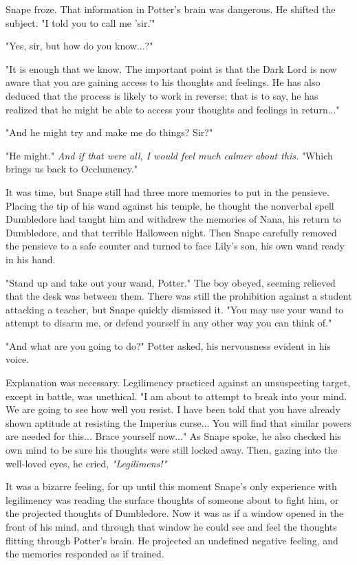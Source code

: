\documentclass[a4paper,11pt]{article}
\begin{document}
Snape froze. That information in Potter's brain was dangerous. He shifted the subject. "I told you to call me 'sir.'"

"Yes, sir, but how do you know...?"

"It is enough that we know. The important point is that the Dark Lord is now aware that you are gaining access to his thoughts and feelings. He has also deduced that the process is likely to work in reverse; that is to say, he has realized that he might be able to access your thoughts and feelings in return..."

"And he might try and make me do things? Sir?"

"He might." \emph{And if that were all, I would feel much calmer about this.} "Which brings us back to Occlumency."

It was time, but Snape still had three more memories to put in the pensieve. Placing the tip of his wand against his temple, he thought the nonverbal spell Dumbledore had taught him and withdrew the memories of Nana, his return to Dumbledore, and that terrible Halloween night. Then Snape carefully removed the pensieve to a safe counter and turned to face Lily's son, his own wand ready in his hand.

"Stand up and take out your wand, Potter." The boy obeyed, seeming relieved that the desk was between them. There was still the prohibition against a student attacking a teacher, but Snape quickly dismissed it. "You may use your wand to attempt to disarm me, or defend yourself in any other way you can think of."

"And what are you going to do?" Potter asked, his nervousness evident in his voice.

Explanation was necessary. Legilimency practiced against an unsuspecting target, except in battle, was unethical. "I am about to attempt to break into your mind. We are going to see how well you resist. I have been told that you have already shown aptitude at resisting the Imperius curse... You will find that similar powers are needed for this... Brace yourself now..." As Snape spoke, he also checked his own mind to be sure his thoughts were still locked away. Then, gazing into the well-loved eyes, he cried, \emph{"Legilimens!"}

It was a bizarre feeling, for up until this moment Snape's only experience with legilimency was reading the surface thoughts of someone about to fight him, or the projected thoughts of Dumbledore. Now it was as if a window opened in the front of his mind, and through that window he could see and feel the thoughts flitting through Potter's brain. He projected an undefined negative feeling, and the memories responded as if trained.
\end{document}
